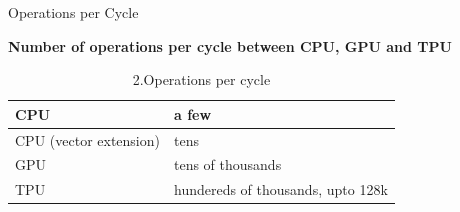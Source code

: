 \documentclass[c]{beamer}
\begin{document}
	\begin{frame}{Operations per Cycle}
	\begin{center}
	{\large \textbf{Number of operations per cycle between CPU, GPU and TPU}}
	\linebreak
	\end{center}
	\begin{table}
	\begin{tabular}{p{5.5cm} p{5.5cm}}
	\hline
	CPU \linebreak & a few   \\
	\hline
	CPU (vector extension) & tens \linebreak \\
	\hline
	GPU \linebreak & tens of thousands  \\
	\hline
	TPU \linebreak & hundereds of thousands, upto 128k\\
	\hline
	\end{tabular}
	\caption{2.Operations per cycle}
	 \label{tab:tab2}
	\end{table}
	\end{frame}
	
\end{document}
